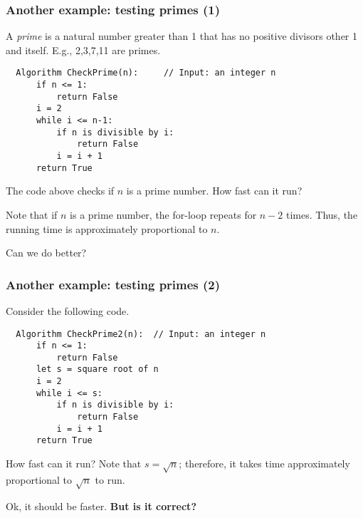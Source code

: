 \documentclass{beamer}
\begin{document}
\begin{frame}[fragile]\frametitle{Another example: testing primes (1)}
  A {\em prime} is a natural number greater than 1 that has no
  positive divisors other 1 and itself.  E.g., 2,3,7,11 are primes.
  \pause

  \begin{tcolorbox}
  {\small
\begin{verbatim}
  Algorithm CheckPrime(n):     // Input: an integer n
      if n <= 1:
          return False
      i = 2
      while i <= n-1:
          if n is divisible by i:
              return False
          i = i + 1
      return True
\end{verbatim}
  }
  \end{tcolorbox}
  
  The code above checks if $n$ is a prime number.   How fast can it run?
  \pause

  Note that if $n$ is a prime number, the for-loop repeats for $n-2$
  times.  Thus, the running time is approximately proportional to
  $n$.
  \pause

  Can we do better?
\end{frame}

\begin{frame}[fragile]\frametitle{Another example: testing primes (2)}
  Consider the following code.
  
  \begin{tcolorbox}
  {\small
\begin{verbatim}
  Algorithm CheckPrime2(n):  // Input: an integer n
      if n <= 1:
          return False
      let s = square root of n
      i = 2
      while i <= s:
          if n is divisible by i:
              return False
          i = i + 1
      return True
\end{verbatim}
  }
  \end{tcolorbox}
  
  How fast can it run? \pause Note that $s = \sqrt{n}$; therefore, it
  takes time approximately proportional to $\sqrt{n}$ to run.
  \pause

  Ok, it should be faster.  {\bf But is it correct?}

\end{frame}
\end{document}
